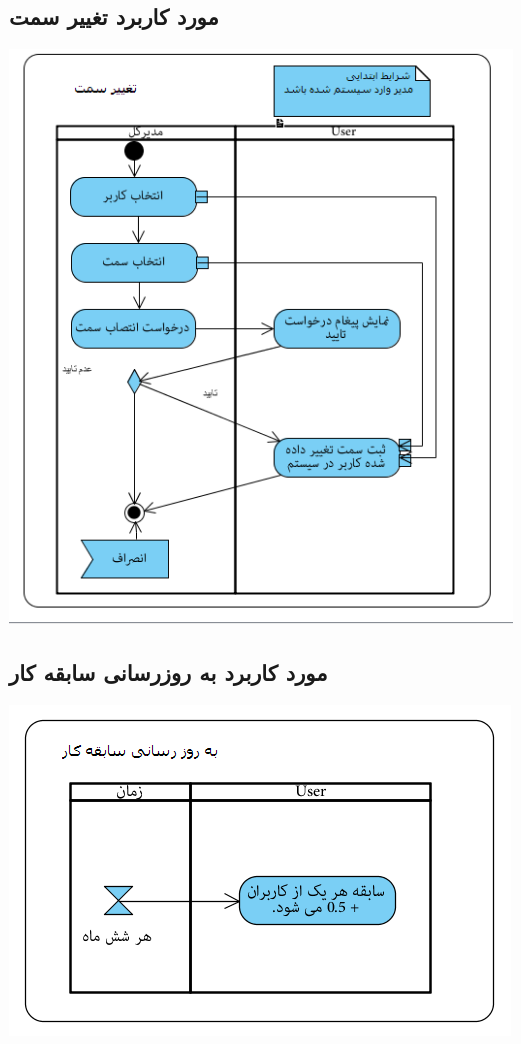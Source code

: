 \newpage
\vspace{2cm}
\subsection*{مورد کاربرد تغییر سمت}
\vspace{2cm}
\begin{center}
\includegraphics[width=\textwidth]{ActivityDiagramsWithSwimlanes/8.png}
\end{center}

\newpage
\vspace{2cm}
\subsection*{مورد کاربرد به روزرسانی سابقه کار}
\vspace{2cm}
\begin{center}
\includegraphics[width=\textwidth]{ActivityDiagramsWithSwimlanes/9.png}
\end{center}

